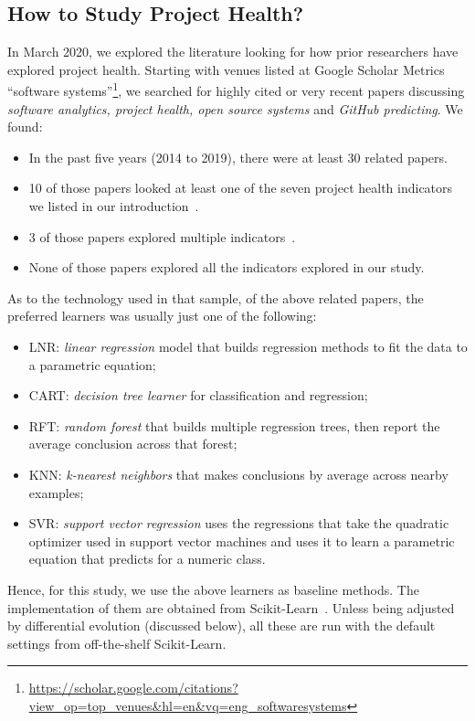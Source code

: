 \documentclass[sigconf,anonymous,review]{acmart}
\newcommand{\bi}{\begin{itemize}}
\newcommand{\ei}{\end{itemize}}
\begin{document}
\subsection{How to Study Project Health?}
\label{tion:lit}


In March 2020, we explored the literature looking for how prior researchers have explored project health. 
Starting with venues listed at Google Scholar Metrics 
``software systems''\footnote{\url{https://scholar.google.com/citations?view_op=top_venues&hl=en&vq=eng_softwaresystems}}, we searched for highly cited or very recent papers discussing 
{\em software analytics, project health, open  source systems} and {\em GitHub predicting}.
We found:
\bi
\item In the past five years (2014 to 2019), there were at least 30 related papers.
\item 10 of those papers looked at least one of the seven project health indicators we listed in our introduction~\cite{liao2019healthy,borges2016predicting,jarczyk2018surgical,kikas2016using,qi2017software,aggarwal2014co,chen2014predicting,han2019characterization,weber2014makes,bidoki2018cross}.
\item 3 of those papers explored multiple indicators~\cite{liao2019healthy,jarczyk2018surgical,bidoki2018cross}.
\item None of those papers explored all the indicators explored in our study. 
\ei
As to the technology used in that sample, of the above
related papers,   the preferred learners was usually just one of the following:
\bi
\item  LNR: {\em linear regression} model that builds regression methods to fit the data to a parametric equation; 
\item CART: {\em decision tree learner} for classification and regression;
\item RFT:  {\em random forest}   that builds multiple regression trees, then report the average conclusion across that forest;
\item KNN:  {\em k-nearest neighbors} that makes conclusions by average across nearby examples;
\item SVR:   {\em support vector regression} uses the regressions that take the quadratic optimizer used in support vector machines and uses it to learn a parametric equation that predicts for a numeric class. 
\ei
Hence, for this study, we use the above learners as baseline methods. The implementation of them are obtained from Scikit-Learn~\cite{pedregosa2011scikit}. Unless being adjusted by differential evolution (discussed below), all these are run with the default settings from off-the-shelf Scikit-Learn.
\end{document}
